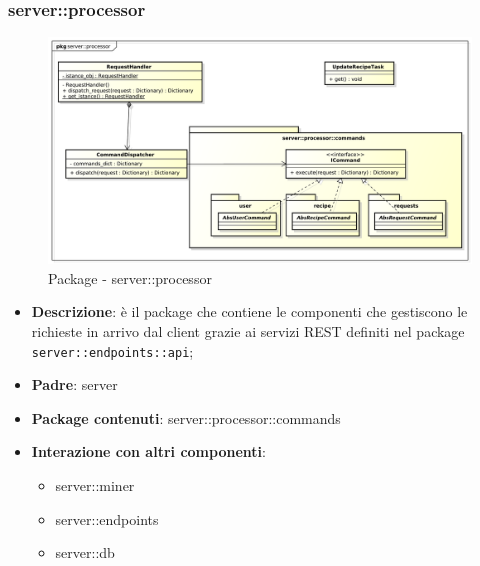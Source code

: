 


\subsubsection{server::processor} %
\label{ssub:bdsm_app_server_processor}
\begin{figure}[!htbp]
  \centering
  \centerline{\includegraphics[scale=0.4]{./images/server/processor.pdf}}
  \caption{Package - server::processor}
\end{figure}

\begin{itemize}
  \item \textbf{Descrizione}: è il package che contiene le componenti che gestiscono le richieste in arrivo dal client grazie ai servizi REST definiti nel package \texttt{server::endpoints::api};
  \item \textbf{Padre}: server
  \item \textbf{Package contenuti}: server::processor::commands
  \item \textbf{Interazione con altri componenti}:
    \begin{itemize}
      \item server::miner
      \item server::endpoints
      \item server::db
    \end{itemize}
\end{itemize}

